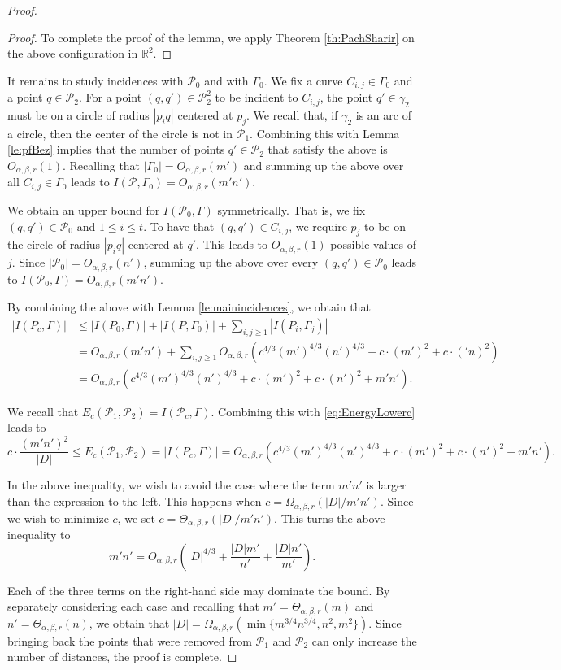 \documentclass[11pt]{article}
\theoremstyle{definition}
\newcommand{\parag}[1]{\vspace{2mm}
\noindent{\bf #1} }
\newcommand{\RR}{\mathbb R}
\newcommand{\pts}{\mathcal{P}}
\newcommand{\curves}{\Gamma}
\begin{document}
\begin{proof}
\begin{proof}
To complete the proof of the lemma, we apply Theorem \ref{th:PachSharir} on the above configuration in $\RR^2$. 
%
\end{proof}

\parag{Wrapping up.}
It remains to study incidences with $\pts_0$ and with $\curves_0$.
We fix a curve  $C_{i,j}\in\Gamma_0$ and a point $q\in \pts_2$.
For a point $(q,q')\in \pts_2^2$ to be incident to $C_{i,j}$, the point $q'\in\gamma_2$ must be on a circle of radius $|p_iq|$ centered at $p_j$.
We recall that, if $\gamma_2$ is an arc of a circle, then the center of the circle is not in $\pts_1$.
Combining this with Lemma \ref{le:pfBez} implies that the number of points $q'\in\pts_2$ that satisfy the above is $O_{\alpha,\beta,r}(1)$. 
Recalling that $|\curves_0|=O_{\alpha,\beta,r}(m')$ and summing up the above over all $C_{i,j}\in\Gamma_0$ leads to $I(\pts,\curves_0)=O_{\alpha,\beta,r}(m'n')$. 
 
We obtain an upper bound for $I(\pts_0,\curves)$ symmetrically. 
That is, we fix $(q,q')\in \pts_0$ and $1\le i \le t$. 
To have that $(q,q')\in C_{i,j}$, we require $p_j$ to be on the circle of radius $|p_iq|$ centered at $q'$.
This leads to $O_{\alpha,\beta,r}(1)$ possible values of $j$. 
Since $|\pts_0|= O_{\alpha,\beta,r}(n')$, summing up the above over every $(q,q')\in \pts_0$ leads to $I(\pts_0,\curves)=O_{\alpha,\beta,r}(m'n')$. 

By combining the above with Lemma \ref{le:mainincidences}, we obtain that 
 \begin{align*}
|I(P_c,\Gamma)| &\leq |I(P_0, \Gamma)| + |I(P,\Gamma_0)| + \sum_{i,j\ge 1} |I(P_i,\curves_j)| \\
   &= O_{\alpha,\beta,r}(m'n') +\sum_{i,j\ge 1} O_{\alpha,\beta,r}(c^{4/3} (m')^{4/3}(n')^{4/3} + c\cdot(m')^2 + c\cdot('n)^2) \\
   &=O_{\alpha,\beta,r}( c^{4/3}(m')^{4/3}(n')^{4/3}+ c\cdot(m')^2+ c\cdot(n')^2+m'n').
 \end{align*}

We recall that $E_c(\pts_1,\pts_2)= I(\pts_c,\curves)$.
Combining this with \eqref{eq:EnergyLowerc} leads to
%
\[ c\cdot \frac{(m'n')^2}{|D|} \leq E_c(\pts_1,\pts_2) = |I(P_c,\Gamma)| = O_{\alpha,\beta,r}\left(c^{4/3}(m')^{4/3}(n')^{4/3} + c\cdot(m')^2 + c\cdot(n')^2+m'n'\right). \]

In the above inequality, we wish to avoid the case where the term $m'n'$ is larger than the expression to the left.
This happens when $c=\Omega_{\alpha,\beta,r}(|D|/m'n')$.
Since we wish to minimize $c$, we set $c=\Theta_{\alpha,\beta,r}(|D|/m'n')$. 
This turns the above inequality to 
%
\[ m'n' = O_{\alpha,\beta,r}\left(|D|^{4/3} + \frac{|D|m'}{n'} + \frac{|D|n'}{m'}\right). \]

Each of the three terms on the right-hand side may dominate the bound. 
By separately considering each case and recalling that $m'=\Theta_{\alpha,\beta,r}(m)$ and $n'=\Theta_{\alpha,\beta,r}(n)$, we obtain that $|D|=\Omega_{\alpha,\beta,r}(\min\{m^{3/4}n^{3/4},n^2,m^2\})$.
Since bringing back the points that were removed from $\pts_1$ and $\pts_2$ can only increase the number of distances, the proof is complete.
% 
\end{proof}  
\end{document}

